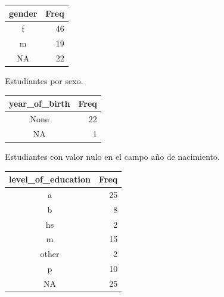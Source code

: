 \documentclass[
  12pt,
  a4paper,
  extrafontsizes,
  onecolumn,
  openright]{memoir}
\begin{document}
\begin{table}

\caption{\label{tbl-contingencia-eco}Tablas de contingencia de la
información socioeconómica de los
estudiantes.}\begin{minipage}[t]{0.50\linewidth}

{\centering 

\hypertarget{tbl-contingencia-eco-1}{}
\begin{longtable}{cr}
\tabularnewline

\toprule
gender & Freq \\ 
\midrule
f & 46 \\ 
m & 19 \\ 
NA & 22 \\ 
\bottomrule
\end{longtable}

Estudiantes por sexo.

}

\end{minipage}%
%
\begin{minipage}[t]{0.50\linewidth}

{\centering 

\hypertarget{tbl-contingencia-eco-2}{}
\begin{longtable}{cr}
\tabularnewline

\toprule
year\_of\_birth & Freq \\ 
\midrule
None & 22 \\ 
NA & 1 \\ 
\bottomrule
\end{longtable}

Estudiantes con valor nulo en el campo año de nacimiento.

}

\end{minipage}%
\newline
\begin{minipage}[t]{0.50\linewidth}

{\centering 

\hypertarget{tbl-contingencia-eco-3}{}
\begin{longtable}{cr}
\tabularnewline

\toprule
level\_of\_education & Freq \\ 
\midrule
a & 25 \\ 
b & 8 \\ 
hs & 2 \\ 
m & 15 \\ 
other & 2 \\ 
p & 10 \\ 
NA & 25 \\ 
\bottomrule
\end{longtable}

}
\end{minipage}
\end{table}
\end{document}
